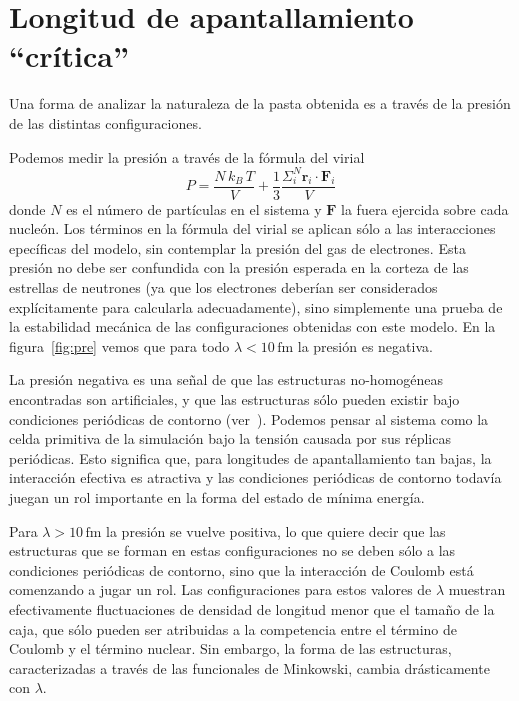 \section{Longitud de apantallamiento ``crítica''}\label{lambda_c}

Una forma de analizar la naturaleza de la pasta obtenida es a través de la presión de las distintas configuraciones.

Podemos medir la presión a través de la fórmula del virial
\begin{equation*}
P=\frac{N\,k_B\,T}{V} + \frac{1}{3}
\frac{\Sigma_{i}^{N}\mathbf{r}_i\cdot\mathbf{F}_i}{V}
\end{equation*}
donde $N$ es el número de partículas en el sistema y $\mathbf{F}$ la fuera ejercida sobre cada nucleón.
Los términos en la fórmula del virial se aplican sólo a las interacciones epecíficas del modelo, sin contemplar la presión del gas de electrones.
Esta presión no debe ser confundida con la presión esperada en la corteza de las estrellas de neutrones (ya que los electrones deberían ser considerados explícitamente para calcularla adecuadamente), sino simplemente una prueba de la estabilidad mecánica de las configuraciones obtenidas con este modelo.
En la figura~\ref{fig:pre} vemos que para todo $\lambda<10\,\text{fm}$ la presión es negativa.

La presión negativa es una señal de que las estructuras no-homogéneas encontradas son artificiales, y que las estructuras sólo pueden existir bajo condiciones periódicas de contorno (ver~\cite{binder,nos13}).
Podemos pensar al sistema como la celda primitiva de la simulación bajo la tensión causada por sus réplicas periódicas.
Esto significa que, para longitudes de apantallamiento tan bajas, la interacción efectiva es atractiva y las condiciones periódicas de contorno todavía juegan un rol importante en la forma del estado de mínima energía.

Para $\lambda>10\,\text{fm}$ la presión se vuelve positiva, lo que quiere decir que las estructuras que se forman en estas configuraciones no se deben sólo a las condiciones periódicas de contorno, sino que la interacción de Coulomb está comenzando a jugar un rol.
Las configuraciones para estos valores de $\lambda$ muestran efectivamente fluctuaciones de densidad de longitud menor que el tamaño de la caja, que sólo pueden ser atribuidas a la competencia entre el término de Coulomb y el término nuclear.
Sin embargo, la forma de las estructuras, caracterizadas a través de las funcionales de Minkowski, cambia drásticamente con $\lambda$.

